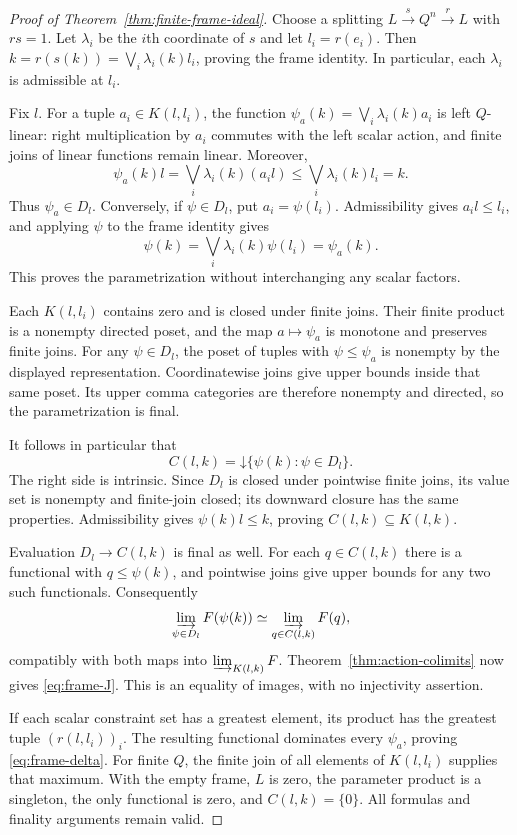 \begin{proof}[Proof of Theorem~\ref{thm:finite-frame-ideal}]
Choose a splitting $L\xrightarrow{s}Q^n\xrightarrow{r}L$ with $rs=1$.
Let $\lambda_i$ be the $i$th coordinate of $s$ and let $l_i=r(e_i)$.
Then $k=r(s(k))=\bigvee_i\lambda_i(k)l_i$, proving the frame identity.
In particular, each $\lambda_i$ is admissible at $l_i$.

Fix $l$. For a tuple $a_i\in K(l,l_i)$, the function
$\psi_a(k)=\bigvee_i\lambda_i(k)a_i$ is left $Q$-linear: right
multiplication by $a_i$ commutes with the left scalar action, and finite
joins of linear functions remain linear. Moreover,
\[
 \psi_a(k)l
 =\bigvee_i\lambda_i(k)(a_i l)
 \leq\bigvee_i\lambda_i(k)l_i=k.
\]
Thus $\psi_a\in D_l$. Conversely, if $\psi\in D_l$, put
$a_i=\psi(l_i)$. Admissibility gives $a_i l\leq l_i$, and applying
$\psi$ to the frame identity gives
\[
 \psi(k)=\bigvee_i\lambda_i(k)\psi(l_i)=\psi_a(k).
\]
This proves the parametrization without interchanging any scalar
factors.

Each $K(l,l_i)$ contains zero and is closed under finite joins. Their
finite product is a nonempty directed poset, and the map
$a\mapsto\psi_a$ is monotone and preserves finite joins. For any
$\psi\in D_l$, the poset of tuples with $\psi\leq\psi_a$ is nonempty
by the displayed representation. Coordinatewise joins give upper
bounds inside that same poset. Its upper comma categories are therefore
nonempty and directed, so the parametrization is final.

It follows in particular that
\[
 C(l,k)=\mathord\downarrow\{\psi(k):\psi\in D_l\}.
\]
The right side is intrinsic. Since $D_l$ is closed under pointwise
finite joins, its value set is nonempty and finite-join closed; its
downward closure has the same properties. Admissibility gives
$\psi(k)l\leq k$, proving $C(l,k)\subseteq K(l,k)$.

Evaluation $D_l\to C(l,k)$ is final as well. For each $q\in C(l,k)$
there is a functional with $q\leq\psi(k)$, and pointwise joins give
upper bounds for any two such functionals. Consequently
\[
 \varinjlim_{\psi\in D_l}F(\psi(k))
 \simeq\varinjlim_{q\in C(l,k)}F(q),
\]
compatibly with both maps into $\varinjlim_{K(l,k)}F$.
Theorem~\ref{thm:action-colimits} now gives \eqref{eq:frame-J}.
This is an equality of images, with no injectivity assertion.

If each scalar constraint set has a greatest element, its product has
the greatest tuple $(r(l,l_i))_i$. The resulting functional dominates
every $\psi_a$, proving \eqref{eq:frame-delta}. For finite $Q$, the
finite join of all elements of $K(l,l_i)$ supplies that maximum. With
the empty frame, $L$ is zero, the parameter product is a singleton, the
only functional is zero, and $C(l,k)=\{0\}$. All formulas and finality
arguments remain valid.
\end{proof}

